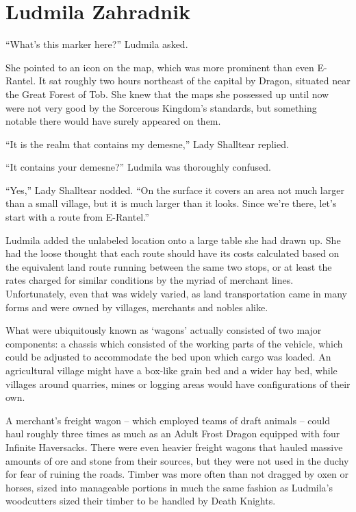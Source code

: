 \chapter{Ludmila Zahradnik}

“What’s this marker here?” Ludmila asked.

 

She pointed to an icon on the map, which was more prominent than even E-Rantel. It sat roughly two hours northeast of the capital by Dragon, situated near the Great Forest of Tob. She knew that the maps she possessed up until now were not very good by the Sorcerous Kingdom’s standards, but something notable there would have surely appeared on them.

 

“It is the realm that contains my demesne,” Lady Shalltear replied.

 

“It contains your demesne?” Ludmila was thoroughly confused.

 

“Yes,” Lady Shalltear nodded. “On the surface it covers an area not much larger than a small village, but it is much larger than it looks. Since we’re there, let’s start with a route from E-Rantel.”

 

Ludmila added the unlabeled location onto a large table she had drawn up. She had the loose thought that each route should have its costs calculated based on the equivalent land route running between the same two stops, or at least the rates charged for similar conditions by the myriad of merchant lines. Unfortunately, even that was widely varied, as land transportation came in many forms and were owned by villages, merchants and nobles alike.

 

What were ubiquitously known as ‘wagons’ actually consisted of two major components: a chassis which consisted of the working parts of the vehicle, which could be adjusted to accommodate the bed upon which cargo was loaded. An agricultural village might have a box-like grain bed and a wider hay bed, while villages around quarries, mines or logging areas would have configurations of their own.

 

A merchant’s freight wagon – which employed teams of draft animals – could haul roughly three times as much as an Adult Frost Dragon equipped with four Infinite Haversacks. There were even heavier freight wagons that hauled massive amounts of ore and stone from their sources, but they were not used in the duchy for fear of ruining the roads. Timber was more often than not dragged by oxen or horses, sized into manageable portions in much the same fashion as Ludmila’s woodcutters sized their timber to be handled by Death Knights.

